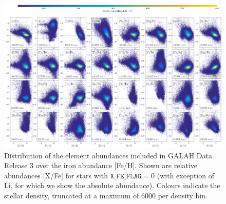 \documentclass[fleqn,usenatbib,useAMS]{mnras}
\begin{document}
\begin{landscape}
\begin{figure}
\includegraphics[width=\columnwidth]{Figures/dr3_abundance_overview_31_elements.png}
\caption{Distribution of the element abundances included in GALAH Data Release 3 over the iron abundance [Fe/H]. Shown are relative abundances [X/Fe] for stars with $\texttt{X\_FE\_FLAG} = 0$ (with exception of Li, for which we show the absolute abundance). Colours indicate the stellar density, truncated at a maximum of 6000 per density bin.} 
\label{fig:abundance_overview}
\end{figure}
\end{landscape}
\end{document}
